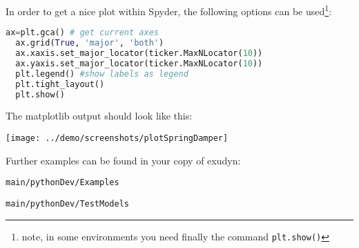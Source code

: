 %
In order to get a nice plot within Spyder, the following options can be used\footnote{note, in some environments you need finally the command \texttt{plt.show()}}:
\begin{lstlisting}[language=Python, firstnumber=77]
  ax=plt.gca() # get current axes
  ax.grid(True, 'major', 'both')
  ax.xaxis.set_major_locator(ticker.MaxNLocator(10))
  ax.yaxis.set_major_locator(ticker.MaxNLocator(10))
  plt.legend() #show labels as legend
  plt.tight_layout()
  plt.show() 
\end{lstlisting}
%

The matplotlib output should look like this:
\begin{center}
  \texttt{[image: ../demo/screenshots/plotSpringDamper]}
\end{center}
%
\vspace{24pt}
Further examples can be found in your copy of exudyn: 
\bi
  \item[] \texttt{main/pythonDev/Examples}
  \item[] \texttt{main/pythonDev/TestModels}
\ei


